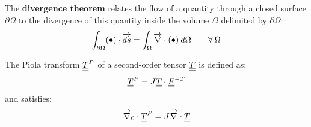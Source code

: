 \begin{theorem}[Ostrogradski]
  The \textbf{divergence theorem} relates the flow of a quantity through a closed surface $\partial\Omega$ to the divergence of this quantity inside the volume $\Omega$ delimited by $\partial \Omega$:
\begin{equation}
  \label{eq:Ostrogradski_th}
  \int_{\partial \Omega} (\bullet)\cdot {\overrightarrow{ds}}=\int_\Omega {\overrightarrow{\nabla}} \cdot (\bullet) \: d\Omega \qquad \forall\:\Omega
\end{equation}
\end{theorem}
\begin{definition}
  \label{def:Piola_transform}
  The Piola transform ${\underline{\underline{T}}}^P$ of a second-order tensor ${\underline{\underline{T}}}$ is defined as:
  \begin{equation*}
    {\underline{\underline{T}}}^P=J{\underline{\underline{T}}}\cdot{\underline{\underline{F}}}^{-T}
  \end{equation*}
  and satisfies:
  \begin{equation*}
    {\overrightarrow{\nabla}}_0\cdot {\underline{\underline{T}}}^P = J {\overrightarrow{\nabla}} \cdot {\underline{\underline{T}}}
  \end{equation*}
\end{definition}

